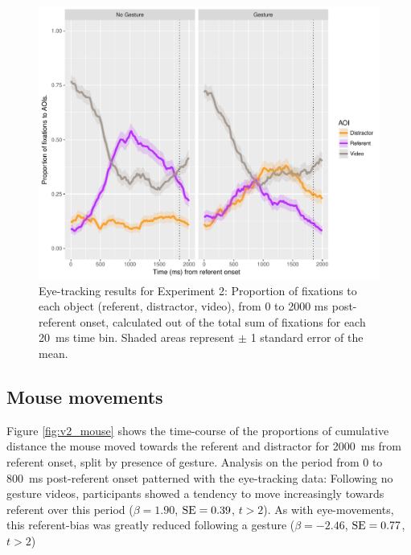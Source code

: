 \documentclass[a4paper,man,natbib]{apa6}
\newcommand{\resultsLM}[3]{$\beta = #1$, $\textnormal{SE} = #2$, $t #3$}
\begin{document}
\begin{figure}[Ht]
  \centering
	\includegraphics[width=\linewidth]{./img/e8_fixations.pdf}
  \caption{Eye-tracking results for Experiment 2: Proportion of fixations to each object (referent, distractor, video), from 0 to 2000 ms post-referent onset, calculated out of the total sum of fixations for each 20~ms time bin. Shaded areas represent $\pm$ 1 standard error of the mean.}
  \label{fig:v2_eye}
\end{figure}



\subsection{Mouse movements}
Figure \ref{fig:v2_mouse} shows the time-course of the proportions of cumulative distance the mouse moved towards the referent and distractor for 2000~ms from referent onset, split by presence of gesture.
Analysis on the period from 0 to 800~ms post-referent onset patterned with the eye-tracking data:
Following no gesture videos, participants showed a tendency to move increasingly towards referent over this period (\resultsLM{1.90}{0.39}{>2}).
As with eye-movements, this referent-bias was greatly reduced following a gesture (\resultsLM{-2.46}{0.77}{>2})
\end{document}
